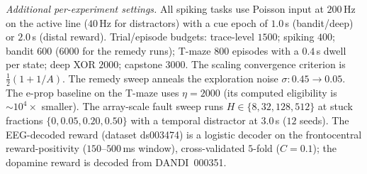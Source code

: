 \begin{table}[htbp!]
\begin{center}
    \label{table:A3}
    \end{center}
    \vspace{0.3em}
    \noindent\footnotesize\emph{Additional per-experiment settings.} All spiking tasks
    use Poisson input at $200$\,Hz on the active line ($40$\,Hz for distractors) with a
    cue epoch of $1.0$\,s (bandit/deep) or $2.0$\,s (distal reward). Trial/episode
    budgets: trace-level $1500$; spiking $400$; bandit $600$ ($6000$ for the remedy
    runs); T-maze $800$ episodes with a $0.4$\,s dwell per state; deep XOR $2000$;
    capstone $3000$. The scaling convergence criterion is $\tfrac{1}{2}(1+1/A)$. The
    remedy sweep anneals the exploration noise $\sigma:0.45\to0.05$. The e-prop baseline
    on the T-maze uses $\eta=2000$ (its computed eligibility is $\sim\!10^4\times$
    smaller). The array-scale fault sweep runs $H\in\{8,32,128,512\}$ at stuck fractions
    $\{0,0.05,0.20,0.50\}$ with a temporal distractor at $3.0$\,s ($12$ seeds). The
    EEG-decoded reward (dataset ds003474) is a logistic decoder on the frontocentral
    reward-positivity ($150$--$500$\,ms window), cross-validated $5$-fold ($C=0.1$); the
    dopamine reward is decoded from DANDI~000351.
\end{table}

